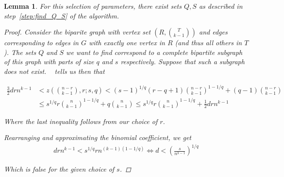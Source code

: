 \documentclass[12pt]{article}
\newtheorem{lemma}[thm]{Lemma}
\theoremstyle{remark}
\begin{document}
    \begin{lemma}\label{lemma:q_s}
        For this selection of parameters,
        there exist sets $Q, S$ as described in step~\ref{step:find_Q_S} of the algorithm.

        \begin{proof}

            Consider the biparite graph with vertex set $\left( R, \binom{T}{k-1} \right)$
            and edges corresponding to edges in $G$ with exactly one vertex in $R$ (and thus all others in $T$).
            The sets $Q$ and $S$ we want to find correspond to a complete bipartite subgraph of this graph
            with parts of size $q$ and $s$ respectively.
            Suppose that such a subgraph does not exist.
            ~\cite{Kovari1954} tells us then that

            \begin{align*}\label{eq:equation}
                \frac{3}{2}drn^{k-1} & < z\left(\binom{n-r}{k-1}, r; s, q  \right) < (s-1)^{1/q}(r-q+1)\binom{n-r}{k-1}^{1-1/q} + (q-1)\binom{n-r}{k-1} \\
                           & \leq s^{1/q} r \binom{n}{k-1}^{1-1/q} + q \binom{n}{k-1} \leq s^{1/q} r \binom{n}{k-1}^{1-1/q} + \frac{1}{2} drn^{k-1}
            \end{align*}

            Where the last inequality follows from our choice of $r$.

            Rearranging and approximating the binomial coefficient, we get
            \begin{align*}
                drn^{k-1} < s^{1/q}r n^{(k-1)(1-1/q)} \iff d < \left( \frac{s}{n^{k-1}} \right)^{1/q}
            \end{align*}

            Which is false for the given choice of $s$.

        \end{proof}

    \end{lemma}
\end{document}
